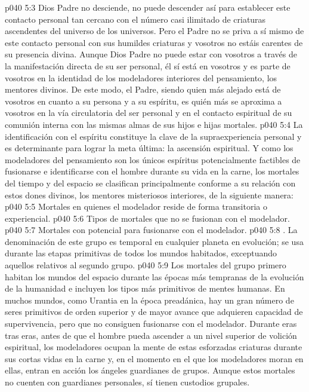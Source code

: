 \vs p040 5:3 Dios Padre no desciende, no puede descender así para establecer este contacto personal tan cercano con el número casi ilimitado de criaturas ascendentes del universo de los universos. Pero el Padre no se priva a sí mismo de este contacto personal con sus humildes criaturas y vosotros no estáis carentes de su presencia divina. Aunque Dios Padre no puede estar con vosotros a través de la manifestación directa de su ser personal, él sí está en vosotros y es parte de vosotros en la identidad de los modeladores interiores del pensamiento, los mentores divinos. De este modo, el Padre, siendo quien más alejado está de vosotros en cuanto a su persona y a su espíritu, es quién más se aproxima a vosotros en la vía circulatoria del ser personal y en el contacto espiritual de su comunión interna con las mismas almas de sus hijos e hijas mortales.
\vs p040 5:4 \pc La identificación con el espíritu constituye la clave de la supraexperiencia personal y es determinante para lograr la meta última: la ascensión espiritual. Y como los modeladores del pensamiento son los únicos espíritus potencialmente factibles de fusionarse e identificarse con el hombre durante su vida en la carne, los mortales del tiempo y del espacio se clasifican principalmente conforme a su relación con estos dones divinos, los mentores misteriosos interiores, de la siguiente manera:
\vs p040 5:5 Mortales en quienes el modelador reside de forma transitoria o experiencial.
\vs p040 5:6 Tipos de mortales que no se fusionan con el modelador.
\vs p040 5:7 Mortales con potencial para fusionarse con el modelador.
\vs p040 5:8 \pc {}. La denominación de este grupo es temporal en cualquier planeta en evolución; se usa durante las etapas primitivas de todos los mundos habitados, exceptuando aquellos relativos al segundo grupo.
\vs p040 5:9 Los mortales del grupo primero habitan los mundos del espacio durante las épocas más tempranas de la evolución de la humanidad e incluyen los tipos más primitivos de mentes humanas. En muchos mundos, como Urantia en la época preadánica, hay un gran número de seres primitivos de orden superior y de mayor avance que adquieren capacidad de supervivencia, pero que no consiguen fusionarse con el modelador. Durante eras tras eras, antes de que el hombre pueda ascender a un nivel superior de volición espiritual, los modeladores ocupan la mente de estas esforzadas criaturas durante sus cortas vidas en la carne y, en el momento en el que los modeladores moran en ellas, entran en acción los ángeles guardianes de grupos. Aunque estos mortales no cuenten con guardianes personales, sí tienen custodios grupales.
